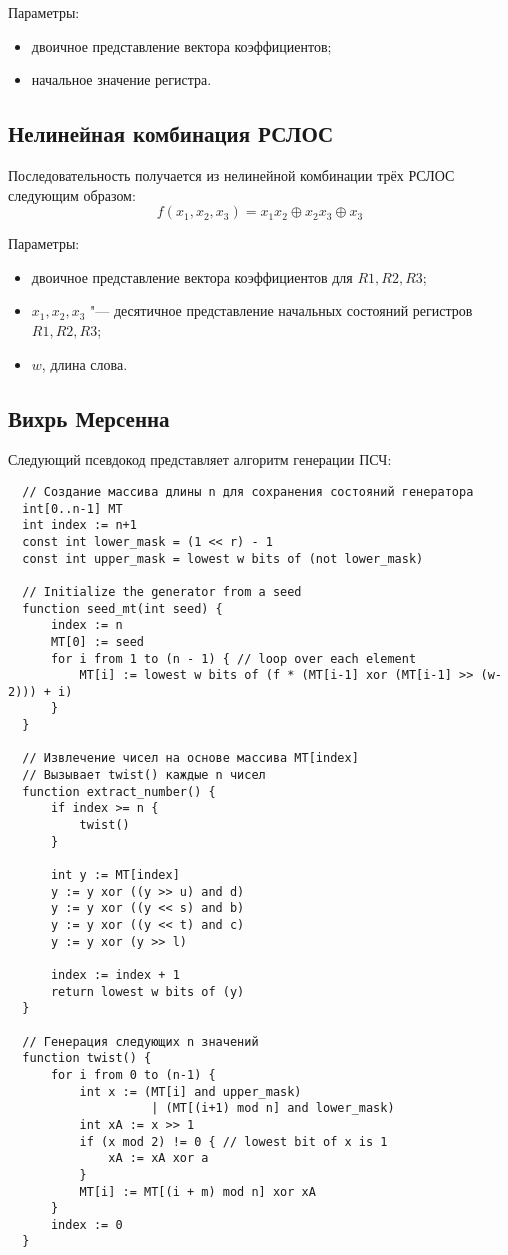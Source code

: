 \documentclass[bachelor, och, labwork]{SCWorks}
\begin{document}
Параметры:
\begin{itemize}
  \item двоичное представление вектора коэффициентов;
  \item начальное значение регистра.
\end{itemize}

\subsection{Нелинейная комбинация РСЛОС}
Последовательность получается из нелинейной комбинации трёх РСЛОС следующим образом:
\[ f(x_1, x_2, x_3) = x_1 x_2 \oplus x_2 x_3 \oplus x_3 \]

Параметры:
\begin{itemize}
  \item двоичное представление вектора коэффициентов для $R1, R2, R3$;
  \item $x_1, x_2, x_3$ "--- десятичное представление начальных состояний регистров $R1, R2, R3$;
  \item $w$, длина слова.
\end{itemize}

\subsection{Вихрь Мерсенна}
Следующий псевдокод представляет алгоритм генерации ПСЧ:
\begin{verbatim}
  // Создание массива длины n для сохранения состояний генератора
  int[0..n-1] MT
  int index := n+1
  const int lower_mask = (1 << r) - 1
  const int upper_mask = lowest w bits of (not lower_mask)
  
  // Initialize the generator from a seed
  function seed_mt(int seed) {
      index := n
      MT[0] := seed
      for i from 1 to (n - 1) { // loop over each element
          MT[i] := lowest w bits of (f * (MT[i-1] xor (MT[i-1] >> (w-2))) + i)
      }
  }
  
  // Извлечение чисел на основе массива MT[index]
  // Вызывает twist() каждые n чисел
  function extract_number() {
      if index >= n {
          twist()
      }
  
      int y := MT[index]
      y := y xor ((y >> u) and d)
      y := y xor ((y << s) and b)
      y := y xor ((y << t) and c)
      y := y xor (y >> l)
  
      index := index + 1
      return lowest w bits of (y)
  }
  
  // Генерация следующих n значений
  function twist() {
      for i from 0 to (n-1) {
          int x := (MT[i] and upper_mask)
                    | (MT[(i+1) mod n] and lower_mask)
          int xA := x >> 1
          if (x mod 2) != 0 { // lowest bit of x is 1
              xA := xA xor a
          }
          MT[i] := MT[(i + m) mod n] xor xA
      }
      index := 0
  }  
\end{verbatim}
\end{document}
